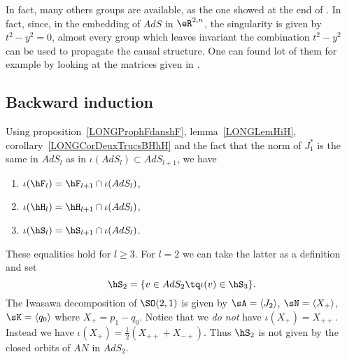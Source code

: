 In fact, many others groups are available, as the one showed at the end of \cite{BTZ_horizon}. In fact, since, in the embedding of $AdS$ in $\eR^{2,n}$, the singularity is given by $t^2-y^2=0$, almost every group which leaves invariant the combination $t^2-y^2$ can be used to propagate the causal structure. One can found lot of them for example by looking at the matrices given in \cite{These}.

%
\subsection{Backward induction}
%

Using proposition~\ref{LONGProphFdanshF}, lemma~\ref{LONGLemHiH}, corollary~\ref{LONGCorDeuxTrucsBHhH} and the fact that the norm of $J_1^*$ is the same in $AdS_l$ as in $\iota(AdS_l)\subset AdS_{l+1}$, we have
\begin{enumerate}
    \item
        $\iota(\hF_l)=\hF_{l+1}\cap\iota(AdS_l)$,
    \item
        $\iota(\hH_l)=\hH_{l+1}\cap\iota(AdS_l)$,
    \item
        $\iota(\hS_l)=\hS_{l+1}\cap\iota(AdS_l)$.
\end{enumerate}
These equalities hold for $l\geq 3$. For $l=2$ we can take the latter as a definition and set
\begin{equation}
    \hS_2=\{ v\in AdS_2\tq \iota(v)\in\hS_3 \}.
\end{equation}
The Iwasawa decomposition of $\SO(2,1)$ is given by $\sA=\langle J_2\rangle$, $\sN=\langle X_+\rangle$, $\sK=\langle q_0\rangle$ where $X_+=p_1-q_0$. Notice that we \emph{do not} have $\iota(X_+)=X_{++}$. Instead we have $\iota(X_+)=\frac{ 1 }{2}(X_{++}+X_{-+})$. Thus $\hS_2$ is not given by the closed orbits of $AN$ in $AdS_2$.

